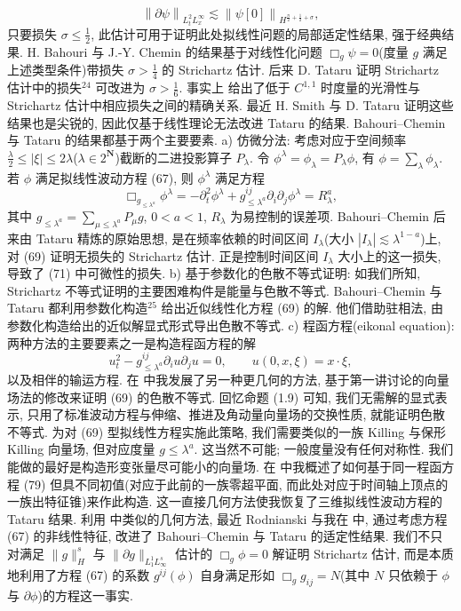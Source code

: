 \[
\left\|\partial\psi\right\|_{L_{t}^{2}L_{x}^{\infty}}\lesssim\left\|\psi[0]\right\|_{H^{\frac{n}{2}+\frac{1}{2}+\sigma}},
\]
只要损失 $\sigma \leq \frac{1}{2}$, 此估计可用于证明此处拟线性问题的局部适定性结果, 强于经典结果. H. Bahouri 与 J.-Y. Chemin 的结果基于对线性化问题 $\Box_g \psi = 0$(度量 $g$ 满足上述类型条件)带损失 $\sigma > \frac{1}{4}$ 的 Strichartz 估计. 后来 D. Tataru \cite{klai72} 证明 Strichartz 估计中的损失$^{24}$ 可改进为 $\sigma > \frac{1}{6}$. 事实上 \cite{klai72} 给出了低于 $C^{1,1}$ 时度量的光滑性与 Strichartz 估计中相应损失之间的精确关系. 最近 H. Smith 与 D. Tataru \cite{klai62} 证明这些结果也是尖锐的, 因此仅基于线性理论无法改进 Tataru 的结果.
Bahouri--Chemin 与 Tataru 的结果都基于两个主要要素.
a) 仿微分法: 考虑对应于空间频率 $\frac{\lambda}{2} \leq |\xi| \leq 2\lambda$($\lambda \in 2^\mathbf{N}$)截断的二进投影算子 $P_\lambda$. 令 $\phi^\lambda = \phi_\lambda = P_\lambda \phi$, 有 $\phi = \sum_\lambda \phi_\lambda$. 若 $\phi$ 满足拟线性波动方程 (67), 则 $\phi^\lambda$ 满足方程
\[
\Box_{g_{\leq\lambda^{a}}}\phi^{\lambda}=-\partial_{t}^{2}\phi^{\lambda}+g_{\leq\lambda^{a}}^{i j}\partial_{i}\partial_{j}\phi^{\lambda}=R_{\lambda}^{a},
\]
其中 $g_{\leq\lambda^a} = \sum_{\mu\leq\lambda^a} P_\mu g$, $0 < a < 1$, $R_\lambda$ 为易控制的误差项. Bahouri--Chemin 后来由 Tataru 精炼的原始思想, 是在频率依赖的时间区间 $I_{\lambda}$(大小 $|I_{\lambda}| \lesssim \lambda^{1-a}$)上, 对 (69) 证明无损失的 Strichartz 估计. 正是控制时间区间 $I_{\lambda}$ 大小上的这一损失, 导致了 (71) 中可微性的损失.
b) 基于参数化的色散不等式证明: 如我们所知, Strichartz 不等式证明的主要困难构件是能量与色散不等式. Bahouri--Chemin 与 Tataru 都利用参数化构造$^{25}$ 给出近似线性化方程 (69) 的解. 他们借助驻相法, 由参数化构造给出的近似解显式形式导出色散不等式.
c) 程函方程(eikonal equation): 两种方法的主要要素之一是构造程函方程的解
\[
u_{t}^{2}-g_{\leq\lambda^{a}}^{i j}\partial_{i}u\partial_{j}u=0,\qquad u(0,x,\xi)=x\cdot\xi,
\]
以及相伴的输运方程.
在 \cite{klai30} 中我发展了另一种更几何的方法, 基于第一讲讨论的向量场法的修改来证明 (69) 的色散不等式. 回忆命题 (1.9) 可知, 我们无需解的显式表示, 只用了标准波动方程与伸缩、推进及角动量向量场的交换性质, 就能证明色散不等式. 为对 (69) 型拟线性方程实施此策略, 我们需要类似的一族 Killing 与保形 Killing 向量场, 但对应度量 $g \leq \lambda^a$. 这当然不可能; 一般度量没有任何对称性. 我们能做的最好是构造形变张量尽可能小的向量场. 在 \cite{klai30} 中我概述了如何基于同一程函方程 (79) 但具不同初值(对应于此前的一族零超平面, 而此处对应于时间轴上顶点的一族出特征锥)来作此构造. 这一直接几何方法使我恢复了三维拟线性波动方程的 Tataru 结果.
利用 \cite{klai30} 中类似的几何方法, 最近 Rodnianski 与我在 \cite{klai42} 中, 通过考虑方程 (67) 的非线性特征, 改进了 Bahouri--Chemin 与 Tataru 的适定性结果. 我们不只对满足 $\|g\|_H^s$ 与 $\|\partial g\|_{L_1^1 L_\infty^s}$ 估计的 $\Box_g \phi = 0$ 解证明 Strichartz 估计, 而是本质地利用了方程 (67) 的系数 $g^{ij}(\phi)$ 自身满足形如 $\Box_g g_{ij} = N$(其中 $N$ 只依赖于 $\phi$ 与 $\partial \phi$)的方程这一事实.
